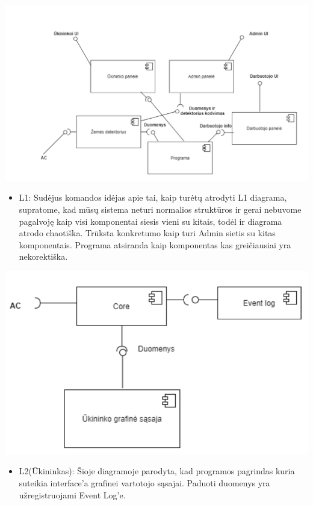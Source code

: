 ﻿\documentclass[oneside]{VUMIFPSkursinis}
\begin{document}
\includegraphics[width=\textwidth,height=\textheight,keepaspectratio]{l1.png}	

\begin{itemize}
	\item L1: Sudėjus komandos idėjas apie tai, kaip turėtų atrodyti L1 diagrama, supratome, kad mūsų sistema neturi normalios struktūros ir gerai nebuvome pagalvoję kaip visi komponentai siesis vieni su kitais, todėl ir diagrama atrodo chaotiška. Trūksta konkretumo kaip turi Admin sietis su kitas komponentais. Programa atsiranda kaip komponentas  kas greičiausiai yra nekorektiška.

\end{itemize}
	\includegraphics[width=\textwidth,height=\textheight,keepaspectratio]{l2uki.png}

	\begin{itemize}
		\item L2(Ūkininkas): Šioje diagramoje parodyta, kad programos pagrindas kuria suteikia interface’a grafinei vartotojo sąsajai. Paduoti duomenys yra užregistruojami Event Log’e.

	\end{itemize}
	
\end{document}
